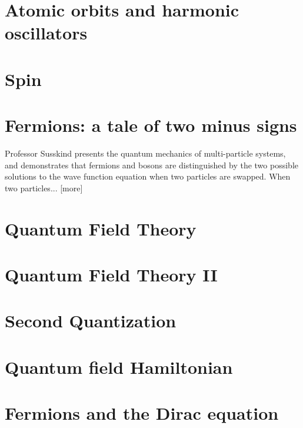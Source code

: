 \documentclass[]{article}
\begin{document}
\section{Atomic orbits and harmonic oscillators}

\section{Spin}

\section{Fermions: a tale of two minus signs}

	Professor Susskind presents the quantum mechanics of multi-particle systems, and demonstrates that fermions and bosons are distinguished by the two possible solutions to the wave function equation when two particles are swapped.  When two particles... [more] 

\section{Quantum Field Theory}

\section{Quantum Field Theory II}

\section {Second Quantization}

\section{Quantum field Hamiltonian}

\section{Fermions and the Dirac equation}
\end{document}
